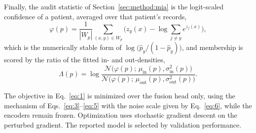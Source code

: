 Finally, the audit statistic of Section~\ref{sec:method:mia} is the
logit-scaled confidence of a patient, averaged over that patient's records,
\begin{equation}
\varphi(p) = \frac{1}{|W_p|}\sum_{(x,y)\in W_p}
\Big( z_y(x) - \log\!\!\sum_{j \neq y} e^{z_j(x)} \Big),
\tag{12}
\label{eq:14}
\end{equation}
which is the numerically stable form of $\log\!\big(\hat{p}_y/(1-\hat{p}_y)\big)$,
and membership is scored by the ratio of the fitted in- and out-densities,
\begin{equation}
\Lambda(p) = \log
\frac{\mathcal{N}\!\big(\varphi(p);\, \mu_{\mathrm{in}}(p), \sigma^2_{\mathrm{in}}(p)\big)}
     {\mathcal{N}\!\big(\varphi(p);\, \mu_{\mathrm{out}}(p), \sigma^2_{\mathrm{out}}(p)\big)} .
\tag{13}
\label{eq:15}
\end{equation}



The objective in Eq.~\eqref{eq:1} is minimized over the fusion head only,
using the mechanism of Eqs.~\eqref{eq:3}--\eqref{eq:5} with the noise scale
given by Eq.~\eqref{eq:6}, while the encoders remain frozen. Optimization uses
stochastic gradient descent on the perturbed gradient. The reported model is
selected by validation performance.
